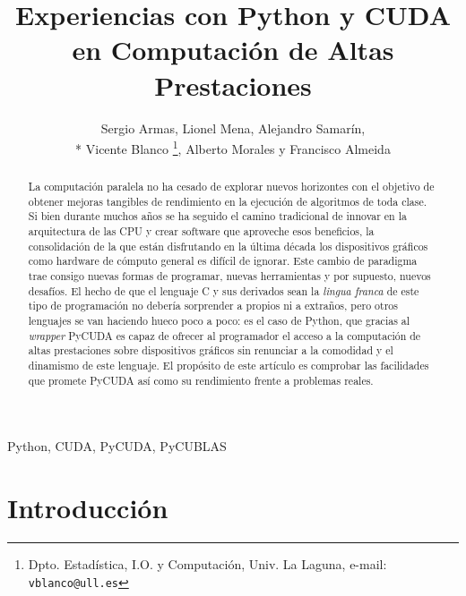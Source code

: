 \documentclass[twocolumn,twoside]{Jornadas}
\begin{document}

\title{Experiencias con Python y CUDA en Computación de Altas Prestaciones}

\author{Sergio Armas, %
     Lionel Mena, %
     Alejandro Samarín,\\*%
     Vicente Blanco %
     \thanks{Dpto. Estadística, I.O. y Computación, Univ. La Laguna, e-mail: {\tt vblanco@ull.es}}, %
     Alberto Morales y %
     Francisco Almeida
}

\maketitle
\markboth{}{}
\pagestyle{empty} 
\thispagestyle{empty} %

\begin{abstract}
La computación paralela no ha cesado de explorar nuevos horizontes con el objetivo de obtener mejoras tangibles de rendimiento en la ejecución de algoritmos de toda clase. Si bien durante muchos años se ha seguido el camino tradicional de innovar en la arquitectura de las CPU y crear software que aproveche esos beneficios, la consolidación de la que están disfrutando en la última década los dispositivos gráficos como hardware de cómputo general es difícil de ignorar. Este cambio de paradigma trae consigo nuevas formas de programar, nuevas herramientas y por supuesto, nuevos desafíos. El hecho de que el lenguaje C y sus derivados sean la \emph{lingua franca} de este tipo de programación no debería sorprender a propios ni a extraños, pero otros lenguajes se van haciendo hueco poco a poco: es el caso de Python, que gracias al \emph{wrapper} PyCUDA \cite{DBLP:journals/corr/abs-0911-3456} es capaz de ofrecer al programador el acceso a la computación de altas prestaciones sobre dispositivos gráficos sin renunciar a la comodidad y el dinamismo de este lenguaje. El propósito de este artículo es comprobar las facilidades que promete PyCUDA así como su rendimiento frente a problemas reales.
\end{abstract}

\begin{keywords}
Python, CUDA, PyCUDA, PyCUBLAS
\end{keywords}

\section{Introducción}
\end{document}
